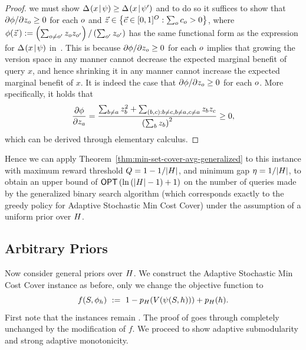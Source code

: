 \begin{proof}
we must show 
$\diff{\prlz}{x} \ge \diff{\prlz'}{x}$ and to do so it suffices to show that $\partial
  \phi / \partial z_{\outcome} \ge 0$ for each $\outcome$ and 
$\vec{z} \in \set{\vec{c} \in [0,1]^{\outcomes} : \sum_{\outcome}
  c_{\outcome} > 0 }$, where 
$\phi(\vec{z}\,) :=  \paren{\sum_{\outcome \neq \outcome'} z_{\outcome}
  z_{\outcome'}} /  \paren{\sum_{\outcome'} z_{\outcome'}}$ has the
same functional form as the expression for $\diff{\prlz}{x}$ in~. 
 This is because $\partial\phi / \partial
z_{\outcome} \ge 0$ for each $\outcome$ implies that growing the version space
in any manner cannot decrease the expected marginal benefit of query $x$, and
hence shrinking it in any manner cannot increase the expected marginal benefit
of $x$. 
It is 
indeed the case that $\partial\phi / \partial
z_{\outcome} \ge 0$ for each $\outcome$.  More specifically, it holds that 
$$ 
\frac{\partial \phi}{\partial z_{a}} =  
\frac{\sum_{b \neq a} z_{b}^2
  +\sum_{(b, c) : b \neq c, b \neq a, c \neq a} z_{b}
  z_{c} }{ \paren{\sum_{b} z_{b}}^2  } \ge 0,$$
which can be derived through elementary calculus.
\end{proof}

Hence we can apply Theorem~\ref{thm:min-set-cover-avg-generalized} to
this \certifying instance with maximum reward threshold $Q =  1 -  1/|\hypotheses|$, and 
minimum gap $\eta = 1/|\hypotheses|$, to obtain an upper bound of 
$\OPT \paren{\ln \paren{|\hypotheses|-1} + 1}$ on the number of
queries made by the 
generalized binary search algorithm (which corresponds exactly to the greedy policy
for Adaptive Stochastic Min Cost Cover) 
under the assumption of a uniform
prior over $\hypotheses$.

\subsection{Arbitrary Priors} 
Now consider general priors over $\hypotheses$.  
We construct the 
Adaptive Stochastic Min Cost Cover 
instance as before, only we change the objective function to 
\begin{equation}
  \label{eq:active-learning-obj}
f(S, \rlz_h) \ :=  \ 1 - \prior(\vs(\prlz(S, h)  ) ) + \prior(h)\mbox{.}  
\end{equation}
First note that the instances remain \certifying.  The proof of 
goes through completely unchanged by the modification of $f$.  We proceed to
show adaptive submodularity and strong adaptive monotonicity.

